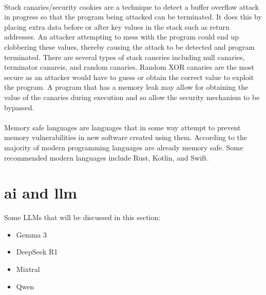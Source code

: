 \paragraph{}Stack canaries/security cookies are a technique to detect a buffer overflow attack in progress so that the program being attacked can be terminated. It does this by placing extra data before or after key values in the stack such as return addresses. An attacker attempting to mess with the program could end up clobbering these values, thereby causing the attack to be detected and program terminated. There are several types of stack caneries including null canaries, terminator canareis, and random canaries. Random XOR canaries are the most secure as an attacker would have to guess or obtain the correct value to exploit the program. A program that has a memory leak may allow for obtaining the value of the canaries during execution and so allow the security mechanism to be bypassed. \autocite{michiel_lemmens_stack_2021}

\paragraph{}Memory safe languages are languages that in some way attempt to prevent memory vulnerabilities in new software created using them. According to \cite{rina_diane_caballar_move_2023} the majority of modern programming languages are already memory safe. Some recommended modern languages include Rust, Kotlin, and Swift.


\section{\acrlong{ai} and \acrlong{llm}}
Some LLMs that will be discussed in this section:

\begin{itemize}
\item{Gemma 3}
\item{DeepSeek R1}
\item{Mixtral}
\item{Qwen}
\end{itemize}

